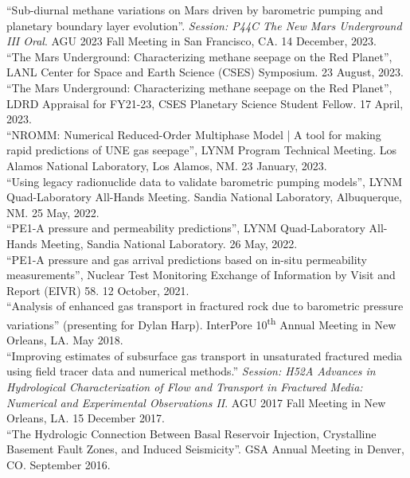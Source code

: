 \documentclass[11pt, letterpaper]{article}
\newcommand{\years}[1]{\marginnote{\scriptsize #1}}
\begin{document}
``Sub-diurnal methane variations on Mars driven by barometric pumping and
planetary boundary layer evolution''. \textit{Session: P44C The New Mars
Underground III Oral}. AGU 2023 Fall Meeting in San Francisco, CA. 14 December,
2023.\\
%
\years{2023} ``The Mars Underground: Characterizing methane seepage on the Red
Planet'', LANL Center for Space and Earth Science (CSES) Symposium. 23 August,
2023.\\ 
%
\years{2023} ``The Mars Underground: Characterizing methane seepage on the Red
Planet'', LDRD Appraisal for FY21-23, CSES Planetary Science Student Fellow. 17 April,
2023.\\
%
\years{2023} ``NROMM: Numerical Reduced-Order Multiphase Model | A tool for
making rapid predictions of UNE gas seepage'', LYNM Program Technical Meeting.
Los Alamos National Laboratory, Los Alamos, NM. 23 January, 2023.\\
%
\years{2022} ``Using legacy radionuclide data to validate barometric pumping
models'', LYNM Quad-Laboratory All-Hands Meeting. Sandia National Laboratory, Albuquerque, NM.
25 May, 2022.\\
%
\years{2022} ``PE1-A pressure and permeability predictions'', LYNM
Quad-Laboratory All-Hands Meeting, Sandia National Laboratory. 26 May, 2022.\\
%
\years{2021}
``PE1-A pressure and gas arrival predictions based on in-situ permeability
measurements'', Nuclear Test Monitoring Exchange of Information by Visit and
Report (EIVR) 58. 12 October, 2021.\\
%
\years{2018}
``Analysis of enhanced gas transport in fractured rock due to barometric pressure
variations'' (presenting for Dylan Harp). InterPore 10\textsuperscript{th} Annual
Meeting in New Orleans, LA. May 2018.\\
%
\years{2017}
``Improving estimates of subsurface gas transport in unsaturated fractured media
using field tracer data and numerical methods.''  \textit{Session: H52A Advances
    in Hydrological Characterization of Flow and Transport in Fractured Media:
Numerical and Experimental Observations II}. AGU 2017 Fall Meeting in New
Orleans, LA. 15 December 2017. \\
%
\years{2016}
``The Hydrologic Connection Between Basal Reservoir Injection, Crystalline
Basement Fault Zones, and Induced Seismicity''.  GSA Annual Meeting in Denver,
CO. September 2016.
\GeologicalSocietyofAOOOOTheHydrologicConnect
\end{document}
